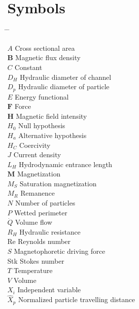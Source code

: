 \section*{Symbols}
\begin{tabbing}
 \hspace*{1.6cm} \= \hspace*{8cm} \= \kill

 $A$ \> Cross sectional area \> [m$^{2}$] \\[0.5ex]
 $\mathbf{B}$ \> Magnetic flux density \> [T] \\[0.5ex]
 $C$ \> Constant \> [$-$] \\[0.5ex]
 $D_{H}$ \> Hydraulic diameter of channel \> [m] \\[0.5ex]
 $D_{p}$ \> Hydraulic diameter of particle  \> [m] \\[0.5ex]
 $E$ \> Energy functional \> [$-$] \\[0.5ex] 
 $\mathbf{F}$ \> Force \> [N] \\[0.5ex]
 $\mathbf{H}$ \>  Magnetic field intensity \> [A/m] \\[0.5ex]
 $H_{0}$ \>  Null hypothesis \> [$-$] \\[0.5ex] 
 $H_{a}$ \>  Alternative hypothesis \> [$-$] \\[0.5ex] 
 $H_{C}$ \>  Coercivity \> [A/m] \\[0.5ex] 
 $J$ \> Current density \> [A/m${^2}$] \\[0.5ex]
 $L_{H}$ \> Hydrodynamic entrance length \> [m] \\[0.5ex]
 $\mathbf{M}$ \> Magnetization \> [A/m] \\[0.5ex]
 $M_{S}$ \> Saturation magnetization \> [A/m] \\[0.5ex]
 $M_{R}$ \> Remanence \> [A/m] \\[0.5ex]
 $N$ \> Number of particles \> [$-$] \\[0.5ex]
 $P$ \> Wetted perimeter \> [m] \\[0.5ex] 
 $\dot{Q}$ \> Volume flow \> [m$^{3}$/s] \\[0.5ex]
 $R_{H}$ \> Hydraulic resistance \> [kg$\cdot$ s/m$^{2}$] \\[0.5ex]
 Re \> Reynolds number \> [$-$] \\[0.5ex] 
 $S$ \> Magnetophoretic driving force \> [T$\cdot$A/m$^{2}$] \\[0.5ex]
 Stk \> Stokes number \> [$-$] \\[0.5ex]
 $T$ \> Temperature \> [K] \\[0.5ex] 
 $V$ \> Volume \> [m$^{3}$] \\[0.5ex]
 $X_{i}$ \> Independent variable \> [$-$] \\[0.5ex] 
 $\hat{X}_{p}$ \> Normalized particle travelling distance \> [$-$] \\[0.5ex] 


\end{tabbing}
